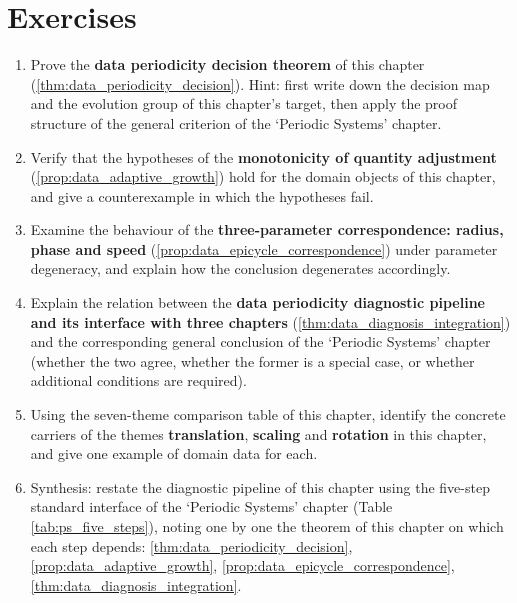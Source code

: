 \section*{Exercises}

\begin{enumerate}[leftmargin=3em, label=\textbf{Exercise \arabic*}]
    \item Prove the \textbf{data periodicity decision theorem} of this chapter (\ref{thm:data_periodicity_decision}). Hint: first write down the decision map and the evolution group of this chapter's target, then apply the proof structure of the general criterion of the `Periodic Systems' chapter.

    \item Verify that the hypotheses of the \textbf{monotonicity of quantity adjustment} (\ref{prop:data_adaptive_growth}) hold for the domain objects of this chapter, and give a counterexample in which the hypotheses fail.

    \item Examine the behaviour of the \textbf{three-parameter correspondence: radius, phase and speed} (\ref{prop:data_epicycle_correspondence}) under parameter degeneracy, and explain how the conclusion degenerates accordingly.

    \item Explain the relation between the \textbf{data periodicity diagnostic pipeline and its interface with three chapters} (\ref{thm:data_diagnosis_integration}) and the corresponding general conclusion of the `Periodic Systems' chapter (whether the two agree, whether the former is a special case, or whether additional conditions are required).

    \item Using the seven-theme comparison table of this chapter, identify the concrete carriers of the themes \textbf{translation}, \textbf{scaling} and \textbf{rotation} in this chapter, and give one example of domain data for each.

    \item Synthesis: restate the diagnostic pipeline of this chapter using the five-step standard interface of the `Periodic Systems' chapter (Table \ref{tab:ps_five_steps}), noting one by one the theorem of this chapter on which each step depends: \ref{thm:data_periodicity_decision}, \ref{prop:data_adaptive_growth}, \ref{prop:data_epicycle_correspondence}, \ref{thm:data_diagnosis_integration}.
\end{enumerate}


